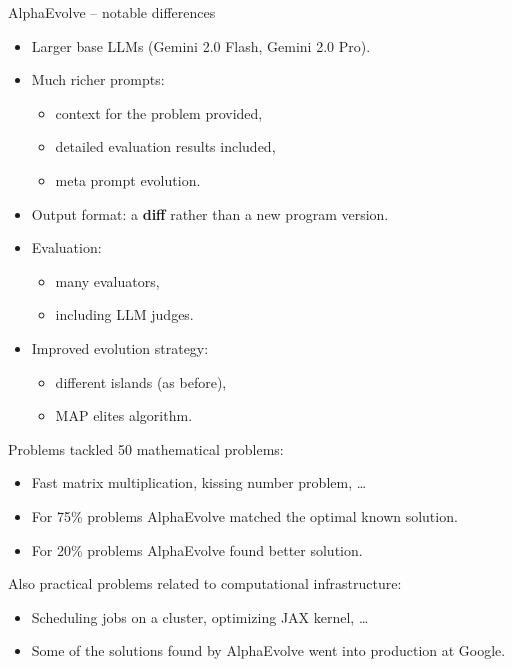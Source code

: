 \documentclass{beamer}
\begin{document}
\begin{frame}{AlphaEvolve -- notable differences}
\begin{itemize}
\item Larger base LLMs (Gemini 2.0 Flash, Gemini 2.0 Pro).
\item Much richer prompts:
\begin{itemize}
\item context for the problem provided,
\item detailed evaluation results included,
\item meta prompt evolution.
\end{itemize}
\item Output format: a \textbf{diff} rather than a new program version.
\item Evaluation:
\begin{itemize}
\item many evaluators,
\item including LLM judges.
\end{itemize}
\item Improved evolution strategy:
\begin{itemize}
\item different islands (as before),
\item MAP elites algorithm.
\end{itemize}
\end{itemize}

\end{frame}

\begin{frame}{Problems tackled}
50 mathematical problems:
\begin{itemize}
\item Fast matrix multiplication, kissing number problem, \ldots
\item For 75\% problems AlphaEvolve matched the optimal known solution.
\item For 20\% problems AlphaEvolve found better solution.
\end{itemize}
Also practical problems related to computational infrastructure:
\begin{itemize}
\item Scheduling jobs on a cluster, optimizing JAX kernel, \ldots
\item Some of the solutions found by AlphaEvolve went into production at Google.
\end{itemize}

\end{frame}
\end{document}
